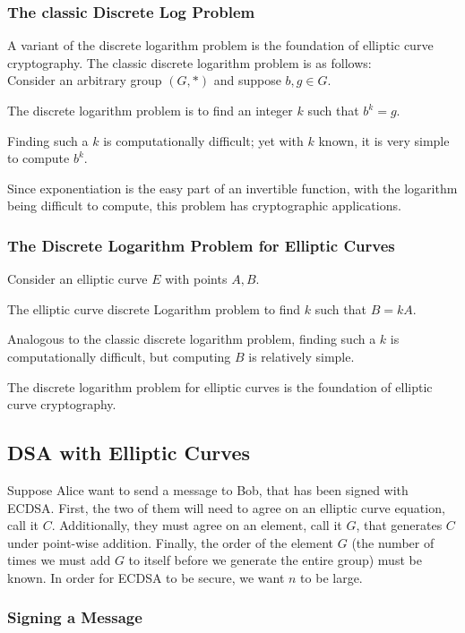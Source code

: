 \subsubsection{The classic Discrete Log Problem}
A variant of the discrete logarithm problem is the foundation of elliptic
curve cryptography.  The classic discrete logarithm problem is as follows:\\

Consider an arbitrary group $(G, *)$ and suppose $b,g \in G$.

The discrete logarithm problem is to find an integer $k$
such that $b^k = g$.

Finding such a $k$ is computationally difficult; yet
with $k$ known, it is very simple to compute $b^k$.

Since exponentiation is the easy part of an invertible function, with
the logarithm being difficult to compute, this problem has cryptographic
applications.


\subsubsection{The Discrete Logarithm Problem for Elliptic Curves}

Consider an elliptic curve $E$ with points $A,B$.

The elliptic curve discrete Logarithm problem to find $k$
such that $B = kA$.

Analogous to the classic discrete logarithm problem, finding such a $k$
is computationally difficult, but computing $B$ is relatively simple.

The discrete logarithm problem for elliptic curves is the foundation of
elliptic curve cryptography.

\subsection{DSA with Elliptic Curves}

Suppose Alice want to send a message to Bob, that has been signed with ECDSA.
First, the two of them will need to agree on an elliptic curve equation, call it $C$.
Additionally, they must agree on an element, call it $G$, that generates $C$ under
point-wise addition.  Finally, the order of the element $G$ (the number of times we must add
$G$ to itself before we generate the entire group) must be known. In order for ECDSA to be
secure, we want $n$ to be large.


\subsubsection{Signing a Message}

